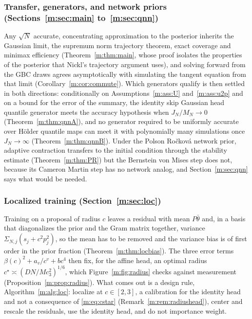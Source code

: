 \subsubsection{Transfer, generators, and network priors (Sections~\ref{m:sec:main} to~\ref{m:sec:qnn})} Any $\sqrt N$ accurate, concentrating approximation to the posterior inherits the Gaussian limit, the supremum norm trajectory theorem, exact coverage and minimax efficiency (Theorem~\ref{m:thm:main}, whose proof isolates the properties of the posterior that Nickl's trajectory argument uses), and solving forward from the GBC draws agrees asymptotically with simulating the tangent equation from that limit (Corollary~\ref{m:cor:commute}). Which generators qualify is then settled in both directions: conditionally on Assumptions~\ref{m:ass:U} and~\ref{m:ass:u2p} and on a bound for the error of the summary, the identity skip Gaussian head quantile generator meets the accuracy hypothesis when $J_N/M_N\to0$ (Theorem~\ref{m:thm:qnnA}), and no generator required to be uniformly accurate over H\"older quantile maps can meet it with polynomially many simulations once $J_N\to\infty$ (Theorem~\ref{m:thm:qnnB}). Under the Polson Ro\v{c}kov\'a network prior, adaptive contraction transfers to the initial condition through the stability estimate (Theorem~\ref{m:thm:PR}) but the Bernstein von Mises step does not, because its Cameron Martin step has no network analog, and Section~\ref{m:sec:qnn} says what would be needed.

\subsubsection{Localized training (Section~\ref{m:sec:loc})} Training on a proposal of radius $c$ leaves a residual with mean $P\bar\theta$ and, in a basis that diagonalizes the prior and the Gram matrix together, variance $\Sigma_{N,j}(s_j+c^2p_j^2)$, so the mean has to be removed and the variance bias is of first order in the prior fraction (Theorem~\ref{m:thm:locbias}). The three error terms $\beta(c)^2+a_v/c^v+bc^4$ then fix, for the affine head, an optimal radius $c^\star\asymp(DN/Mc_3^2)^{1/6}$, which Figure~\ref{m:fig:radius} checks against measurement (Proposition~\ref{m:prop:radius}). What comes out is a design rule, Algorithm~\ref{m:alg:loc}: localize at $c\in[2,3]$, a calibration for the identity head and not a consequence of \eqref{m:eq:cstar} (Remark~\ref{m:rem:radiushead}), center and rescale the residuals, use the identity head, and do not importance weight.

